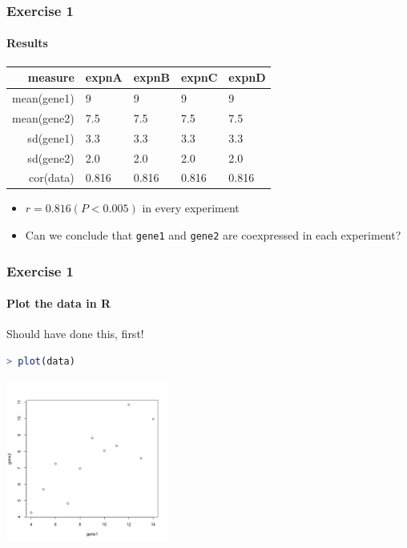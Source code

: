 \documentclass[table]{beamer}
\begin{document}
  \begin{frame}
    \frametitle{Exercise 1}
    \framesubtitle{Results}
    \begin{center}
	\begin{tabular}{r|l|l|l|l}
	  measure & expnA & expnB & expnC & expnD \\
	  \hline
	  mean(gene1) & 9     & 9     & 9     & 9 \\
	  mean(gene2) & 7.5   & 7.5   & 7.5   & 7.5 \\
  	  sd(gene1)   & 3.3   & 3.3   & 3.3   & 3.3 \\
  	  sd(gene2)   & 2.0   & 2.0   & 2.0   & 2.0 \\  
	  cor(data)   & 0.816 & 0.816 & 0.816 & 0.816 \\  
	\end{tabular}
	\end{center}
	\begin{itemize}
      \item<2-> $r=0.816 (P<0.005)$ in every experiment
      \item<2-> Can we conclude that \texttt{gene1} and \texttt{gene2} are coexpressed in each experiment?
    \end{itemize}
  \end{frame}

  \begin{frame}[fragile]
    \frametitle{Exercise 1}
    \framesubtitle{Plot the data in R}
    Should have done this, first! \\
    \begin{lstlisting}[language=R]
> plot(data)
    \end{lstlisting}
    \begin{center}
      \includegraphics[width=0.4\textwidth]{images/ex1_screenshot_d}        
    \end{center}
\end{frame}
\end{document}
